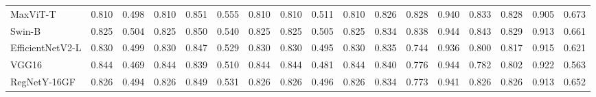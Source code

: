 \begin{table}[t]
\begin{tabular}{lcccccccccccccccc}
MaxViT-T & 0.810 & 0.498 & 0.810 & 0.851 & 0.555 & 0.810 & 0.810 & 0.511 & 0.810 & 0.826 & 0.828 & 0.940 & 0.833 & 0.828 & 0.905 & 0.673 \\
Swin-B & 0.825 & 0.504 & 0.825 & 0.850 & 0.540 & 0.825 & 0.825 & 0.505 & 0.825 & 0.834 & 0.838 & 0.944 & 0.843 & 0.829 & 0.913 & 0.661 \\
EfficientNetV2-L & 0.830 & 0.499 & 0.830 & 0.847 & 0.529 & 0.830 & 0.830 & 0.495 & 0.830 & 0.835 & 0.744 & 0.936 & 0.800 & 0.817 & 0.915 & 0.621 \\
VGG16 & 0.844 & 0.469 & 0.844 & 0.839 & 0.510 & 0.844 & 0.844 & 0.481 & 0.844 & 0.840 & 0.776 & 0.944 & 0.782 & 0.802 & 0.922 & 0.563 \\
RegNetY-16GF & 0.826 & 0.494 & 0.826 & 0.849 & 0.531 & 0.826 & 0.826 & 0.496 & 0.826 & 0.834 & 0.773 & 0.941 & 0.826 & 0.826 & 0.913 & 0.652 \\
\hline
\end{tabular}
\end{table}
